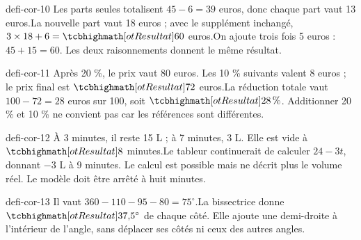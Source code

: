 \begin{blocEdition}{defi-cor-10}
Les parts seules totalisent $45-6=39$ euros, donc chaque part vaut 13 euros.La nouvelle part vaut 18 euros ; avec le supplément inchangé, $3\times18+6=\res{60}$ euros.On ajoute trois fois 5 euros : $45+15=60$. Les deux raisonnements donnent le même résultat.\label{fig-defi-cor-10}

\end{blocEdition}
\begin{blocEdition}{defi-cor-11}
Après 20 \%, le prix vaut 80 euros. Les 10 \% suivants valent 8 euros ; le prix final est $\res{72}$ euros.La réduction totale vaut $100-72=28$ euros sur 100, soit $\res{28\,\%}$. Additionner 20 \% et 10 \% ne convient pas car les références sont différentes.
\end{blocEdition}
\begin{blocEdition}{defi-cor-12}
À 3 minutes, il reste 15 L ; à 7 minutes, 3 L. Elle est vide à $\res8$ minutes.Le tableur continuerait de calculer $24-3t$, donnant $-3$ L à 9 minutes. Le calcul est possible mais ne décrit plus le volume réel. Le modèle doit être arrêté à huit minutes.\label{fig-defi-cor-12}

\end{blocEdition}
\begin{blocEdition}{defi-cor-13}
Il vaut $360-110-95-80=75^\circ$.La bissectrice donne $\res{37{,}5^\circ}$ de chaque côté. Elle ajoute une demi-droite à l’intérieur de l’angle, sans déplacer ses côtés ni ceux des autres angles.\label{fig-defi-cor-13}

\end{blocEdition}
